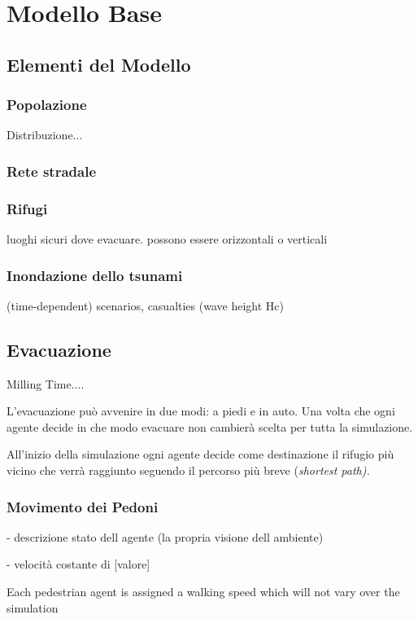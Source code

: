 \section{Modello Base}

\subsection{Elementi del Modello}

\subsubsection{Popolazione}
Distribuzione... 

\subsubsection{Rete stradale}

\subsubsection{Rifugi}
luoghi sicuri dove evacuare. possono essere orizzontali o verticali

\subsubsection{Inondazione dello tsunami}
(time-dependent) scenarios, casualties (wave height Hc) 

\subsection{Evacuazione}
Milling Time....

L'evacuazione può avvenire in due modi: a piedi e in auto. Una volta che ogni agente decide
in che modo evacuare non cambierà scelta per tutta la simulazione.

All'inizio della simulazione ogni agente decide come destinazione il rifugio più vicino 
che verrà raggiunto seguendo il percorso più breve (\it{shortest path}).


\subsubsection{Movimento dei Pedoni}
- descrizione stato dell agente (la propria visione dell ambiente)

- velocità costante di [valore]

Each pedestrian agent is assigned a
walking speed which will not vary over the simulation

